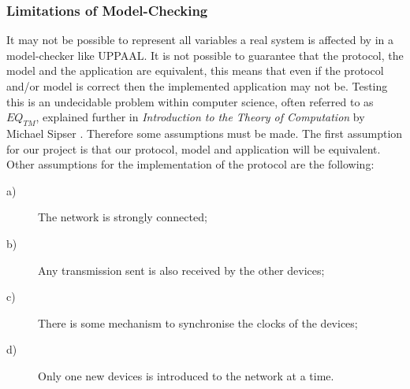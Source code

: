 \subsubsection{Limitations of Model-Checking}

It may not be possible to represent all variables a real system is affected by in a model-checker like UPPAAL.
It is not possible to guarantee that the protocol, the model and the application are equivalent, this means that even if the protocol and/or model is correct then the implemented application may not be. 
Testing this is an undecidable problem within computer science, often referred to as $EQ_{TM}$, explained further in \textit{Introduction to the Theory of Computation} by Michael Sipser \citep[p. 220]{Sipser}.
Therefore some assumptions must be made. 
The first assumption for our project is that our protocol, model and application will be equivalent.
Other assumptions for the implementation of the protocol are the following: 
\begin{description}
    \item [a)] The network is strongly connected;
    \item [b)] Any transmission sent is also received by the other devices;
    \item [c)] There is some mechanism to synchronise the clocks of the devices;
    \item [d)] Only one new devices is introduced to the network at a time.
\end{description}
